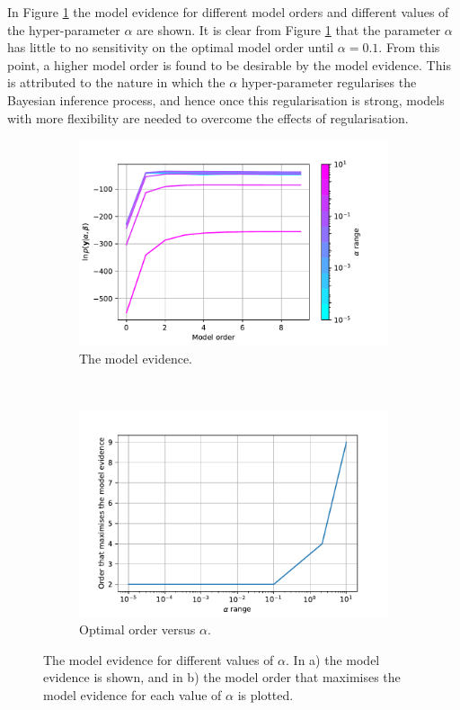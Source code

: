 \documentclass{article}
\begin{document}
In Figure \ref{fig:Q2_evidence} the model evidence for different model orders and different values of the hyper-parameter $\alpha$ are shown. It is clear from Figure \ref{fig:Q2_evidence} that the parameter $\alpha$ has little to no sensitivity on the optimal model order until $\alpha = 0.1$. From this point, a higher model order is found to be desirable by the model evidence. This is attributed to the nature in which the  $\alpha$ hyper-parameter regularises the Bayesian inference process, and hence once this regularisation is strong, models with more flexibility are needed to overcome the effects of regularisation.
\begin{figure}[htb!]
     \centering
     \begin{subfigure}[b]{0.45\textwidth}
         \centering
         \includegraphics[width=\textwidth]{Q2_12.pdf}
         \caption{The model evidence.}
     \end{subfigure}
     ~
     \begin{subfigure}[b]{0.45\textwidth}
         \centering
         \includegraphics[width=\textwidth]{Q2_13.pdf}
         \caption{Optimal order versus $\alpha$.}
     \end{subfigure}
     
     \caption{The model evidence for different values of $\alpha$. In a) the model evidence is shown, and in b) the model order that maximises the model evidence for each value of $\alpha$ is plotted. }
     \label{fig:Q2_evidence}
\end{figure}
\end{document}

